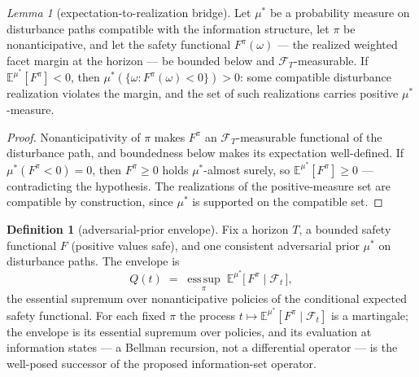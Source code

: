 \documentclass[10pt,twocolumn]{article}
\theoremstyle{plain}
\theoremstyle{definition}
\newtheorem{definition}[theorem]{Definition}
\theoremstyle{remark}
\newtheorem{lemma}{Lemma}
\begin{document}
\begin{lemma}[expectation-to-realization bridge]\label{dual-lem:bridge}
Let $\mu^{*}$ be a probability measure on disturbance paths compatible with
the information structure, let $\pi$ be nonanticipative, and let the
safety functional $F^{\pi}(\omega)$ --- the realized weighted facet margin
at the horizon --- be bounded below and $\mathcal{F}_{T}$-measurable. If
$\mathbb{E}^{\mu^{*}}[F^{\pi}] < 0$, then
$\mu^{*}(\{\omega: F^{\pi}(\omega) < 0\}) > 0$: some compatible disturbance
realization violates the margin, and the set of such realizations carries
positive $\mu^{*}$-measure.
\end{lemma}
\begin{proof}
Nonanticipativity of $\pi$ makes $F^{\pi}$ an $\mathcal{F}_{T}$-measurable
functional of the disturbance path, and boundedness below makes its
expectation well-defined. If $\mu^{*}(F^{\pi} < 0) = 0$, then
$F^{\pi} \ge 0$ holds $\mu^{*}$-almost surely, so
$\mathbb{E}^{\mu^{*}}[F^{\pi}] \ge 0$ --- contradicting the hypothesis. The
realizations of the positive-measure set are compatible by construction,
since $\mu^{*}$ is supported on the compatible set.
\end{proof}

\begin{definition}[adversarial-prior envelope]\label{dual-def:envelope}
Fix a horizon $T$, a bounded safety functional $F$ (positive values safe),
and one consistent adversarial prior $\mu^{*}$ on disturbance paths. The
envelope is
\[
Q(t) \;=\; \operatorname*{ess\,sup}_{\pi} \;
\mathbb{E}^{\mu^{*}}\bigl[\, F^{\pi} \;\big|\; \mathcal{F}_{t} \,\bigr],
\]
the essential supremum over nonanticipative policies of the conditional
expected safety functional. For each fixed $\pi$ the process
$t \mapsto \mathbb{E}^{\mu^{*}}[F^{\pi} \mid \mathcal{F}_{t}]$ is a
martingale; the envelope is its essential supremum over policies, and its
evaluation at information states --- a Bellman recursion, not a
differential operator --- is the well-posed successor of the proposed
information-set operator.
\end{definition}
\end{document}
